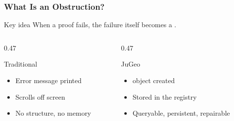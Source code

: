 \begin{frame}
\frametitle{What Is an Obstruction?}
\begin{block}{Key idea}
  When a proof \textcolor{jugeoRed}{fails}, the failure itself becomes a
  .
\end{block}
\vspace{8pt}
\begin{columns}[T]
\begin{column}{0.47\textwidth}
\begin{alertblock}{Traditional}
  \begin{itemize}
    \item Error message printed
    \item Scrolls off screen
    \item No structure, no memory
  \end{itemize}
\end{alertblock}
\end{column}
\begin{column}{0.47\textwidth}
\begin{exampleblock}{JuGeo}
  \begin{itemize}
    \item {} object created
    \item Stored in the registry
    \item Queryable, persistent, repairable
  \end{itemize}
\end{exampleblock}
\end{column}
\end{columns}
\vspace{8pt}
\begin{center}
\end{center}
\end{frame}

